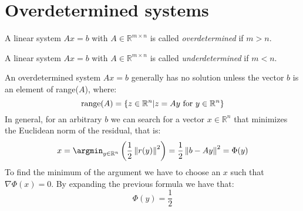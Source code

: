 \section{Overdetermined systems}

\begin{definition}
    A linear system $Ax=b$ with $A \in \mathbb{R}^{m \times n}$ is called \emph{overdetermined} if $m>n$. 

    A linear system $Ax=b$ with $A \in \mathbb{R}^{m \times n}$ is called \emph{underdetermined} if $m<n$. 
\end{definition}

An overdetermined system $Ax=b$ generally has no solution unless the vector $b$ is an element of range($A$), where: 
\[\textnormal{range}(A)=\{z \in \mathbb{R}^n|z=Ay \textnormal{ for } y \in \mathbb{R}^n\}\]
In general, for an arbitrary $b$ we can search for a vector $x \in \mathbb{R}^n$ that minimizes the Euclidean norm of the residual, that is: 
\[x=\argmin_{y \in \mathbb{R}^n}\left( \dfrac{1}{2}\left\lVert r(y) \right\rVert^2 \right)=\dfrac{1}{2}\left\lVert b-Ay \right\rVert^2 = \Phi (y)\]
To find the minimum of the argument we have to choose an $x$ such that $\nabla\Phi(x)=0$. 
By expanding the previous formula we have that: 
\[\Phi(y)=\dfrac{1}{2}\]









